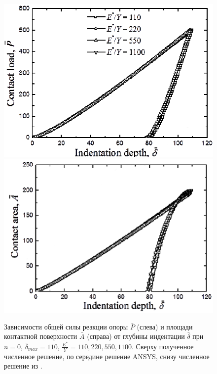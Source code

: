 \documentclass[]{article}
\begin{document}
\begin{figure}[h!]
	\includegraphics[height=0.18\textheight]{pictures/F2_a.png}
	\includegraphics[height=0.18\textheight]{pictures/F2_b.png}
	\caption{ Зависимости общей силы реакции опоры $\bar{P}$ (слева) и площади контактной поверхности $\bar{A}$ (справа) от глубины индентации $\bar{\delta}$ при ${n=0}$, ${\bar{\delta}_{max}=110}$, ${\frac{E^*}{Y}=110, 220, 550, 1100}$. Сверху полученное численное решение, по середине решение ANSYS, снизу численное решение из \cite{Song2014}.
	}
	\label{fig:res1}
\end{figure}
\end{document}
